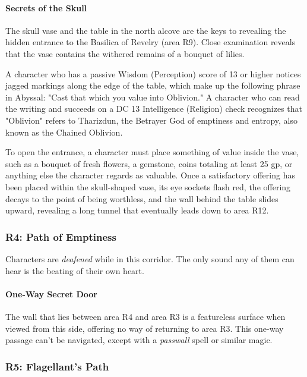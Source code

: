 \documentclass[letterpaper, 11pt, bg=full, twocolumn]{dndbook}
\begin{document}
\paragraph{Secrets of the Skull}

The skull vase and the table in the north alcove are the keys to revealing the hidden entrance to the Basilica of Revelry (area R9). Close examination reveals that the vase contains the withered remains of a bouquet of lilies.

A character who has a passive Wisdom (Perception) score of 13 or higher notices jagged markings along the edge of the table, which make up the following phrase in Abyssal: "Cast that which you value into Oblivion." A character who can read the writing and succeeds on a DC 13 Intelligence (Religion) check recognizes that "Oblivion" refers to Tharizdun, the Betrayer God of emptiness and entropy, also known as the Chained Oblivion.

To open the entrance, a character must place something of value inside the vase, such as a bouquet of fresh flowers, a gemstone, coins totaling at least 25 gp, or anything else the character regards as valuable. Once a satisfactory offering has been placed within the skull-shaped vase, its eye sockets flash red, the offering decays to the point of being worthless, and the wall behind the table slides upward, revealing a long tunnel that eventually leads down to area R12.

\subsubsection{R4: Path of Emptiness}

Characters are \textit{deafened} while in this corridor. The only sound any of them can hear is the beating of their own heart.

\paragraph{One-Way Secret Door}

The wall that lies between area R4 and area R3 is a featureless surface when viewed from this side, offering no way of returning to area R3. This one-way passage can't be navigated, except with a \textit{passwall} spell or similar magic.

\subsubsection{R5: Flagellant's Path}
\end{document}
